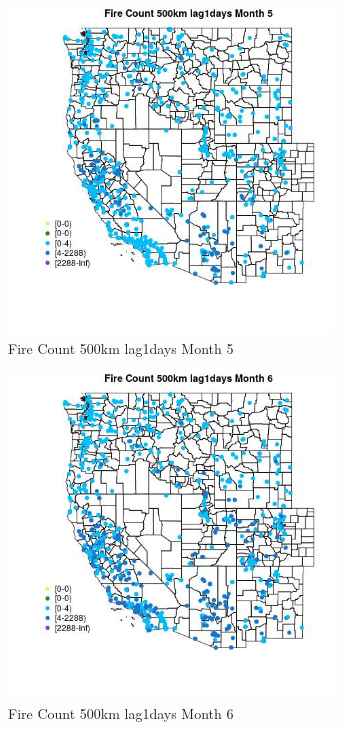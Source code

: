 \begin{figure} 
\centering  
\includegraphics[width=0.77\textwidth]{Code_Outputs/Report_ML_input_PM25_Step4_part_e_de_duplicated_aves_compiled_2019-05-21wNAs_MapObsMo5Fire_Count_500km_lag1days.jpg} 
\caption{\label{fig:Report_ML_input_PM25_Step4_part_e_de_duplicated_aves_compiled_2019-05-21wNAsMapObsMo5Fire_Count_500km_lag1days}Fire Count 500km lag1days Month 5} 
\end{figure} 
 

\begin{figure} 
\centering  
\includegraphics[width=0.77\textwidth]{Code_Outputs/Report_ML_input_PM25_Step4_part_e_de_duplicated_aves_compiled_2019-05-21wNAs_MapObsMo6Fire_Count_500km_lag1days.jpg} 
\caption{\label{fig:Report_ML_input_PM25_Step4_part_e_de_duplicated_aves_compiled_2019-05-21wNAsMapObsMo6Fire_Count_500km_lag1days}Fire Count 500km lag1days Month 6} 
\end{figure} 
 

